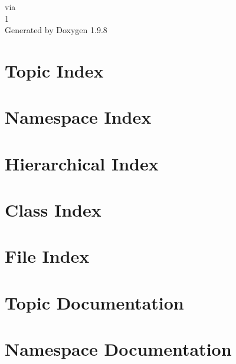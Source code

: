 \documentclass[twoside]{book}
\newcommand{\+}{\discretionary{\mbox{\scriptsize$\hookleftarrow$}}{}{}}
\newcommand{\clearemptydoublepage}{%
    \newpage{\pagestyle{empty}\cleardoublepage}%
  }
\begin{document}
  \raggedbottom
    \hypersetup{pageanchor=false,
                bookmarksnumbered=true,
                pdfencoding=unicode
               }
  \begin{titlepage}
  \vspace*{7cm}
  \begin{center}%
  {\Large via}\\
  [1ex]\large 1 \\
  \vspace*{1cm}
  {\large Generated by Doxygen 1.9.8}\\
  \end{center}
  \end{titlepage}
  \clearemptydoublepage
  \tableofcontents
  \clearemptydoublepage
  \hypersetup{pageanchor=true}

\chapter{Topic Index}

\chapter{Namespace Index}

\chapter{Hierarchical Index}

\chapter{Class Index}

\chapter{File Index}

\chapter{Topic Documentation}


\chapter{Namespace Documentation}


\end{document}
